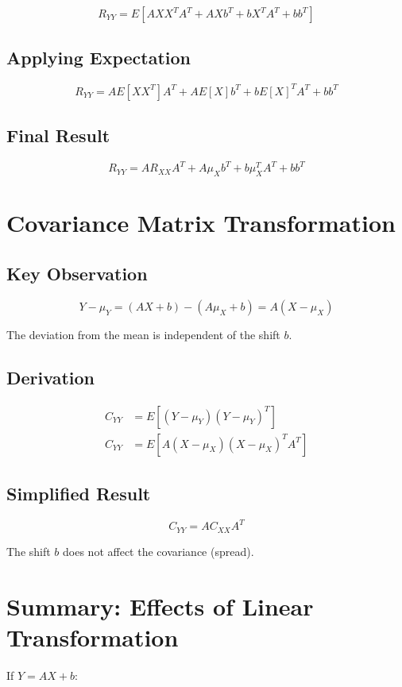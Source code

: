 \documentclass[12pt]{article}
\begin{document}
\[
R_{YY} = E[AXX^T A^T + AXb^T + bX^T A^T + bb^T]
\]

\subsection{Applying Expectation}

\[
R_{YY} = A E[XX^T] A^T + A E[X] b^T + b E[X]^T A^T + bb^T
\]

\subsection{Final Result}

\[
R_{YY} = A R_{XX} A^T + A\mu_X b^T + b\mu_X^T A^T + bb^T
\]

\section{Covariance Matrix Transformation}

\subsection{Key Observation}

\[
Y - \mu_Y = (AX + b) - (A\mu_X + b) = A(X - \mu_X)
\]

The deviation from the mean is independent of the shift $b$.

\subsection{Derivation}

\begin{align*}
C_{YY} &= E[(Y - \mu_Y)(Y - \mu_Y)^T] \\
C_{YY} &= E[A(X - \mu_X)(X - \mu_X)^T A^T]
\end{align*}

\subsection{Simplified Result}

\[
C_{YY} = A C_{XX} A^T
\]

The shift $b$ does not affect the covariance (spread).

\section{Summary: Effects of Linear Transformation}

If $Y = AX + b$:
\end{document}
